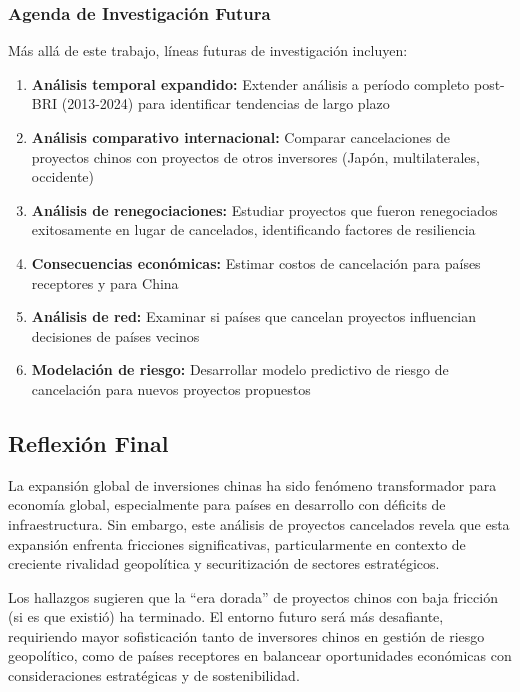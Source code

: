 \documentclass[12pt]{article}
\begin{document}
\subsubsection{Agenda de Investigación Futura}

Más allá de este trabajo, líneas futuras de investigación incluyen:

\begin{enumerate}
    \item \textbf{Análisis temporal expandido:} Extender análisis a período completo post-BRI (2013-2024) para identificar tendencias de largo plazo
    
    \item \textbf{Análisis comparativo internacional:} Comparar cancelaciones de proyectos chinos con proyectos de otros inversores (Japón, multilaterales, occidente)
    
    \item \textbf{Análisis de renegociaciones:} Estudiar proyectos que fueron renegociados exitosamente en lugar de cancelados, identificando factores de resiliencia
    
    \item \textbf{Consecuencias económicas:} Estimar costos de cancelación para países receptores y para China
    
    \item \textbf{Análisis de red:} Examinar si países que cancelan proyectos influencian decisiones de países vecinos
    
    \item \textbf{Modelación de riesgo:} Desarrollar modelo predictivo de riesgo de cancelación para nuevos proyectos propuestos
\end{enumerate}

\subsection{Reflexión Final}

La expansión global de inversiones chinas ha sido fenómeno transformador para economía global, especialmente para países en desarrollo con déficits de infraestructura. Sin embargo, este análisis de proyectos cancelados revela que esta expansión enfrenta fricciones significativas, particularmente en contexto de creciente rivalidad geopolítica y securitización de sectores estratégicos.

Los hallazgos sugieren que la ``era dorada'' de proyectos chinos con baja fricción (si es que existió) ha terminado. El entorno futuro será más desafiante, requiriendo mayor sofisticación tanto de inversores chinos en gestión de riesgo geopolítico, como de países receptores en balancear oportunidades económicas con consideraciones estratégicas y de sostenibilidad.
\end{document}
